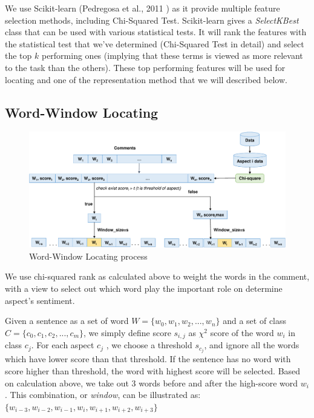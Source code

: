 We use Scikit-learn (Pedregosa et al., 2011 \cite{scikit-learn}) as it provide multiple feature selection methods, including Chi-Squared Test. Scikit-learn gives a \emph{SelectKBest} class that can be used with various statistical tests. It will rank the features with the statistical test that we've determined (Chi-Squared Test in detail) and select the top \(k\) performing ones (implying that these terms is viewed as more relevant to the task than the others). These top performing features will be used for locating and one of the representation method that we will described below.

\subsection{Word-Window Locating}
\begin{figure}[h]
	\centering
	\includegraphics[width=\linewidth]{Chapter3/Figs/window.pdf}
	\caption{Word-Window Locating process}
	\label{fig:wwl}
\end{figure}

We use chi-squared rank as calculated above to weight the words in the comment, with a view to select out which word play the important role on determine aspect's sentiment.

Given a sentence as a set of word \(W = \{w_{0}, w_{1}, w_{2}, ..., w_{n}\}\) and a set of class \(C = \{c_{0}, c_{1}, c_{2}, ..., c_{m}\}\), we simply define score \(s_{i,j}\) as \(\chi^{2}\) score of the word \(w_{i}\) in class \(c_{j}\). For each aspect \(c_{j}\) , we choose a threshold \(s_{c_{j}}\), and ignore all the words which have lower score than that threshold. If the sentence has no word with score higher than threshold, the word with highest score will be selected.
Based on calculation above, we take out 3 words before and after the high-score word \(w_{i}\). This combination, or \emph{window}, can be illustrated as: \(\{w_{i-3}, w_{i-2}, w_{i-1}, w_{i}, w_{i+1}, w_{i+2}, w_{i+3}\}\)


